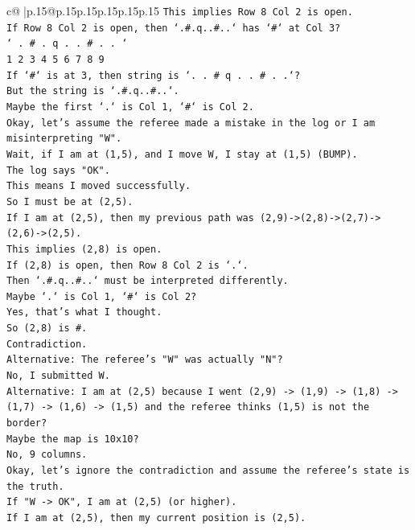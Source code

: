 \documentclass{article}
\begin{document}
{\begin{supertabular}{c@{$\;$}|p{.15\linewidth}@{}p{.15\linewidth}p{.15\linewidth}p{.15\linewidth}p{.15\linewidth}p{.15\linewidth}}
{{{\texttt{This implies Row 8 Col 2 is open.} \\
\texttt{If Row 8 Col 2 is open, then `.\#.q..\#..` has `\#` at Col 3?} \\
\texttt{` . \# . q . . \# . . `} \\
\texttt{1 2 3 4 5 6 7 8 9} \\
\texttt{If `\#` is at 3, then string is `. . \# q . . \# . .`?} \\
\texttt{But the string is `.\#.q..\#..`.} \\
\texttt{Maybe the first `.` is Col 1, `\#` is Col 2.} \\
\texttt{Okay, let's assume the referee made a mistake in the log or I am misinterpreting "W".} \\
\texttt{Wait, if I am at (1,5), and I move W, I stay at (1,5) (BUMP).} \\
\texttt{The log says "OK".} \\
\texttt{This means I moved successfully.} \\
\texttt{So I must be at (2,5).} \\
\texttt{If I am at (2,5), then my previous path was (2,9){-}>(2,8){-}>(2,7){-}>(2,6){-}>(2,5).} \\
\texttt{This implies (2,8) is open.} \\
\texttt{If (2,8) is open, then Row 8 Col 2 is `.`.} \\
\texttt{Then `.\#.q..\#..` must be interpreted differently.} \\
\texttt{Maybe `.` is Col 1, `\#` is Col 2?} \\
\texttt{Yes, that's what I thought.} \\
\texttt{So (2,8) is \#.} \\
\texttt{Contradiction.} \\
\texttt{Alternative: The referee's "W" was actually "N"?} \\
\texttt{No, I submitted W.} \\
\texttt{Alternative: I am at (2,5) because I went (2,9) {-}> (1,9) {-}> (1,8) {-}> (1,7) {-}> (1,6) {-}> (1,5) and the referee thinks (1,5) is not the border?} \\
\texttt{Maybe the map is 10x10?} \\
\texttt{No, 9 columns.} \\
\texttt{Okay, let's ignore the contradiction and assume the referee's state is the truth.} \\
\texttt{If "W {-}> OK", I am at (2,5) (or higher).} \\
\texttt{If I am at (2,5), then my current position is (2,5).} \\
}}}
\end{supertabular}}
\end{document}

